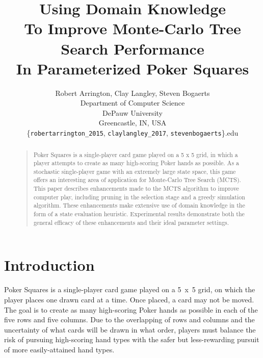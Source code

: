 \documentclass[letterpaper]{article}
\begin{document}
%
\title{Using Domain Knowledge\\To Improve Monte-Carlo Tree Search Performance\\In Parameterized Poker Squares}    %
\author{Robert Arrington, Clay Langley, Steven Bogaerts\\
Department of Computer Science\\
DePauw University\\
Greencastle, IN, USA\\
\{{\tt robertarrington\_2015}, {\tt claylangley\_2017}, {\tt stevenbogaerts}\}{\tt@depauw.edu}
}
\maketitle
\begin{abstract}
\begin{quote}
Poker Squares is a single-player card game played on a 5 x 5 grid, in which a player attempts to create as many high-scoring Poker hands as possible. As a stochastic single-player game with an extremely large state space, this game offers an interesting area of application for Monte-Carlo Tree Search (MCTS). This paper describes enhancements made to the MCTS algorithm to improve computer play, including pruning in the selection stage and a greedy simulation algorithm. These enhancements make extensive use of domain knowledge in the form of a state evaluation heuristic. Experimental results demonstrate both the general efficacy of these enhancements and their ideal parameter settings.
\end{quote}
\end{abstract}

\section{Introduction}

Poker Squares is a single-player card game played on a 5~x~5 grid, on which the player places one drawn card at a time. Once placed, a card may not be moved. The goal is to create as many high-scoring Poker hands as possible in each of the five rows and five columns. Due to the overlapping of rows and columns and the uncertainty of what cards will be drawn in what order, players must balance the risk of pursuing high-scoring hand types with the safer but less-rewarding pursuit of more easily-attained hand types.
\end{document}
